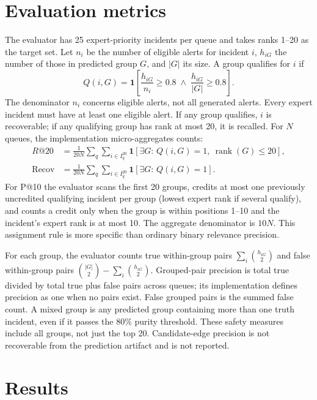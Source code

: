 \section{Evaluation metrics}
The evaluator has 25 expert-priority incidents per queue and takes ranks 1--20 as the target set. Let $n_i$ be the number of eligible alerts for incident $i$, $h_{iG}$ the number of those in predicted group $G$, and $|G|$ its size. A group qualifies for $i$ if
\begin{equation}\label{eq:qualify}Q(i,G)=\mathbf{1}\left[\frac{h_{iG}}{n_i}\geq0.8\;\land\;\frac{h_{iG}}{|G|}\geq0.8\right].\end{equation}
The denominator $n_i$ concerns eligible alerts, not all generated alerts. Every expert incident must have at least one eligible alert. If any group qualifies, $i$ is recoverable; if any qualifying group has rank at most 20, it is recalled. For $N$ queues, the implementation micro-aggregates counts:
\begin{align}\label{eq:recall}
R@20&=\frac{1}{20N}\sum_q\sum_{i\in I_q^{20}}\mathbf1[\exists G:\,Q(i,G)=1,\ \operatorname{rank}(G)\leq20],\\
\operatorname{Recov}&=\frac{1}{20N}\sum_q\sum_{i\in I_q^{20}}\mathbf1[\exists G:\,Q(i,G)=1].
\end{align}
For P@10 the evaluator scans the first 20 groups, credits at most one previously uncredited qualifying incident per group (lowest expert rank if several qualify), and counts a credit only when the group is within positions 1--10 and the incident's expert rank is at most 10. The aggregate denominator is $10N$. This assignment rule is more specific than ordinary binary relevance precision.

For each group, the evaluator counts true within-group pairs $\sum_i\binom{h_{iG}}2$ and false within-group pairs $\binom{|G|}2-\sum_i\binom{h_{iG}}2$. Grouped-pair precision is total true divided by total true plus false pairs across queues; its implementation defines precision as one when no pairs exist. False grouped pairs is the summed false count. A mixed group is any predicted group containing more than one truth incident, even if it passes the 80\% purity threshold. These safety measures include all groups, not just the top 20. Candidate-edge precision is not recoverable from the prediction artifact and is not reported.



\section{Results}
